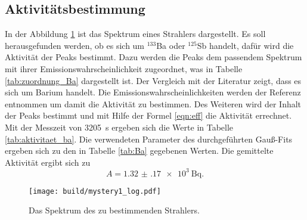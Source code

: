 \subsection{Aktivitätsbestimmung}
\label{sec:Aktiv}
In der Abbildung \ref{fig:mystery1} ist das Spektrum eines Strahlers dargestellt. Es soll herausgefunden werden,
ob es sich um ${}^{133}$Ba oder ${}^{125}$Sb handelt, dafür wird die Aktivität der Peaks bestimmt. Dazu werden
die Peaks dem passendem Spektrum mit ihrer Emissionswahrscheinlichkeit zugeordnet, was in Tabelle \ref{tab:zuordnung_Ba}
dargestellt ist. Der Vergleich mit der Literatur \cite{referenz1} zeigt, dass es sich um Barium handelt. 
Die Emissionswahrscheinlichkeiten werden der Referenz \cite{referenz1} entnommen um damit die Aktivität zu bestimmen. 
Des Weiteren wird der Inhalt der Peaks bestimmt und mit Hilfe der Formel 
\ref{eqn:eff} die Aktivität errechnet. Mit der Messzeit von \SI{3205}{\second} ergeben sich die Werte in Tabelle 
\ref{tab:aktivitaet_ba}. Die verwendeten Parameter des durchgeführten Gauß-Fits ergeben sich zu den in Tabelle \ref{tab:Ba} 
gegebenen Werten. Die gemittelte Aktivität ergibt sich zu
\begin{equation*}
  A = \SI{1.32(17)e3}{\becquerel}.
\end{equation*}
 


\begin{figure}[htb]
 \centering
 \texttt{[image: build/mystery1\_log.pdf]}
 \caption{Das Spektrum des zu bestimmenden Strahlers.}
 \label{fig:mystery1}
\end{figure}
\FloatBarrier


